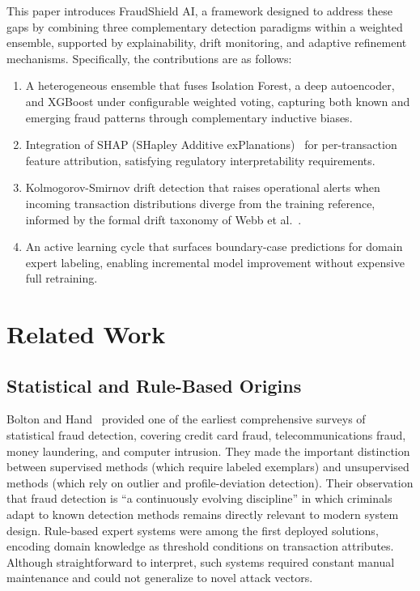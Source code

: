 \documentclass[conference,10pt]{IEEEtran}
\begin{document}
This paper introduces FraudShield AI, a framework designed to address these gaps by combining three complementary detection paradigms within a weighted ensemble, supported by explainability, drift monitoring, and adaptive refinement mechanisms. Specifically, the contributions are as follows:
\begin{enumerate}
    \item A heterogeneous ensemble that fuses Isolation Forest, a deep autoencoder, and XGBoost under configurable weighted voting, capturing both known and emerging fraud patterns through complementary inductive biases.
    \item Integration of SHAP (SHapley Additive exPlanations)~\cite{lundberg2017unified} for per-transaction feature attribution, satisfying regulatory interpretability requirements.
    \item Kolmogorov-Smirnov drift detection that raises operational alerts when incoming transaction distributions diverge from the training reference, informed by the formal drift taxonomy of Webb et al.~\cite{webb2016characterizing}.
    \item An active learning cycle that surfaces boundary-case predictions for domain expert labeling, enabling incremental model improvement without expensive full retraining.
\end{enumerate}

\section{Related Work}

\subsection{Statistical and Rule-Based Origins}
Bolton and Hand~\cite{bolton2002statistical} provided one of the earliest comprehensive surveys of statistical fraud detection, covering credit card fraud, telecommunications fraud, money laundering, and computer intrusion. They made the important distinction between supervised methods (which require labeled exemplars) and unsupervised methods (which rely on outlier and profile-deviation detection). Their observation that fraud detection is ``a continuously evolving discipline'' in which criminals adapt to known detection methods remains directly relevant to modern system design. Rule-based expert systems were among the first deployed solutions, encoding domain knowledge as threshold conditions on transaction attributes. Although straightforward to interpret, such systems required constant manual maintenance and could not generalize to novel attack vectors.
\end{document}
